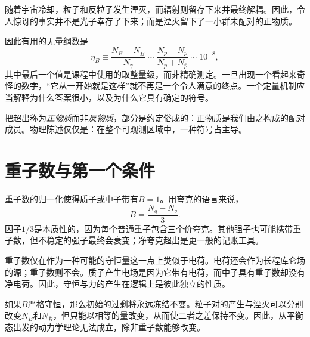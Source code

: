 随着宇宙冷却，粒子和反粒子发生湮灭，而辐射则留存下来并最终解耦。因此，令人惊讶的事实并不是光子幸存了下来；而是湮灭留下了一小群未配对的正物质。

因此有用的无量纲数是
\begin{equation}
\eta_B
\equiv
\frac{N_B-N_{\bar B}}{N_\gamma}
\sim
\frac{N_p-N_{\bar p}}{N_p+N_{\bar p}}
\sim 10^{-8},
\label{eq:c08-baryon-asymmetry}
\end{equation}
其中最后一个值是课程中使用的取整量级，而非精确测定。一旦出现一个看起来奇怪的数字，``它从一开始就是这样''就不再是一个令人满意的终点。一个定量机制应当解释为什么答案很小，以及为什么它具有确定的符号。

把超出称为\emph{正物质}而非\emph{反物质}，部分是约定俗成的：正物质是我们由之构成的配对成员。物理陈述仅仅是：在整个可观测区域中，一种符号占主导。

\section{重子数与第一个条件}

重子数的归一化使得质子或中子带有\(B=1\)。用夸克的语言来说，
\begin{equation}
B=\frac{N_q-N_{\bar q}}{3}.
\label{eq:c08-baryon-number}
\end{equation}
因子\(1/3\)是本质性的，因为每个普通重子包含三个价夸克。其他强子也可能携带重子数，但不稳定的强子最终会衰变；净夸克超出是更一般的记账工具。

\begin{classroomqa}
\end{classroomqa}

重子数仅在作为一种可能的守恒量这一点上类似于电荷。电荷还会作为长程库仑场的源；重子数则不会。质子产生电场是因为它带有电荷，而中子具有重子数却没有净电荷。因此，守恒与力的产生在逻辑上是彼此独立的性质。

\begin{classroomqa}
\end{classroomqa}

如果\(B\)严格守恒，那么初始的过剩将永远冻结不变。粒子对的产生与湮灭可以分别改变\(N_B\)和\(N_{\bar B}\)，但只能以相等的量改变，从而使二者之差保持不变。因此，从平衡态出发的动力学理论无法成立，除非重子数能够改变。

